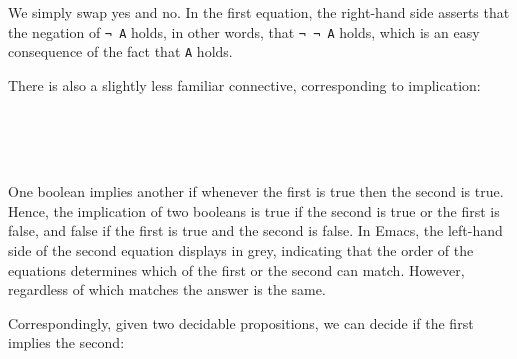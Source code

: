 We simply swap yes and no. In the first equation, the right-hand side
asserts that the negation of \texttt{¬\ A} holds, in other words, that
\texttt{¬\ ¬\ A} holds, which is an easy consequence of the fact that
\texttt{A} holds.

There is also a slightly less familiar connective, corresponding to
implication:

\begin{fence}
\begin{code}%
\>[0]\AgdaSpace{}%
\AgdaSymbol{:}\AgdaSpace{}%
\AgdaSpace{}%
\AgdaSpace{}%
\AgdaSpace{}%
\AgdaSpace{}%
\<%
\\
\>[0]\AgdaSymbol{\AgdaUnderscore{}}%
\>[6]\AgdaSpace{}%
%
\>[15]\AgdaSymbol{=}%
\>[18]\<%
\\
\>[0]\AgdaSpace{}%
\AgdaSpace{}%
\AgdaCatchallClause{\AgdaSymbol{\AgdaUnderscore{}}}%
\>[15]\AgdaSymbol{=}%
\>[18]\<%
\\
\>[0]%
\>[6]\AgdaSpace{}%
%
\>[15]\AgdaSymbol{=}%
\>[18]\<%
\end{code}
\end{fence}

One boolean implies another if whenever the first is true then the
second is true. Hence, the implication of two booleans is true if the
second is true or the first is false, and false if the first is true and
the second is false. In Emacs, the left-hand side of the second equation
displays in grey, indicating that the order of the equations determines
which of the first or the second can match. However, regardless of which
matches the answer is the same.

Correspondingly, given two decidable propositions, we can decide if the
first implies the second:

